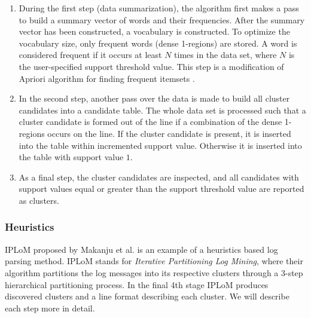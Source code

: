     \begin{enumerate}
       \item During the first step (data summarization), the algorithm first makes a pass to build a summary vector of words and their frequencies. After the summary vector has been constructed, a vocabulary is constructed. To optimize the vocabulary size, only frequent words (dense 1-regions) are stored. A word is considered frequent if it occurs at least $N$ times in the data set, where $N$ is the user-specified support threshold value. This step is a modification of Apriori algorithm for finding frequent itemsets \cite{Agrawal94fastalgorithms}. 
       
       \item In the second step, another pass over the data is made to build all cluster candidates into a candidate table. The whole data set is processed such that a cluster candidate is formed out of the line if a combination of the dense 1-regions occurs on the line. If the cluster candidate is present, it is inserted into the table within incremented support value. Otherwise it is inserted into the table with support value $1$.  
       
       \item As a final step, the cluster candidates are inspected, and all candidates with support values equal or greater than the support threshold value are reported as clusters. 
   \end{enumerate}
   
    
    \subsubsection*{Heuristics}
    IPLoM proposed by Makanju et al. \cite{Makanju2009ALA} is an example of a heuristics based log parsing method. IPLoM stands for \textit{Iterative Partitioning Log Mining}, where their algorithm partitions the log messages into its respective clusters through a 3-step hierarchical partitioning process. In the final 4th stage IPLoM produces discovered clusters and a line format describing each cluster. We will describe each step more in detail.\\
    
